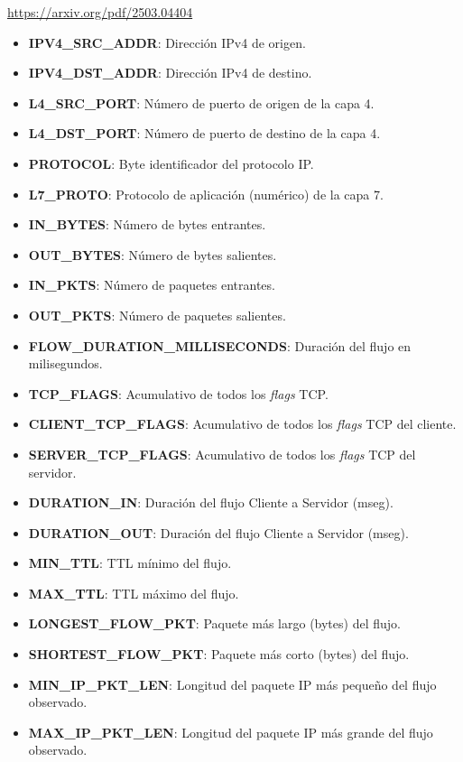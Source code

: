 \url{https://arxiv.org/pdf/2503.04404}

\begin{itemize}
    \item \textbf{IPV4\_SRC\_ADDR}: Dirección IPv4 de origen.
    \item \textbf{IPV4\_DST\_ADDR}: Dirección IPv4 de destino.
    \item \textbf{L4\_SRC\_PORT}: Número de puerto de origen de la capa 4.
    \item \textbf{L4\_DST\_PORT}: Número de puerto de destino de la capa 4.
    \item \textbf{PROTOCOL}: Byte identificador del protocolo IP.
    \item \textbf{L7\_PROTO}: Protocolo de aplicación (numérico) de la capa 7.
    \item \textbf{IN\_BYTES}: Número de bytes entrantes.
    \item \textbf{OUT\_BYTES}: Número de bytes salientes.
    \item \textbf{IN\_PKTS}: Número de paquetes entrantes.
    \item \textbf{OUT\_PKTS}: Número de paquetes salientes.
    \item \textbf{FLOW\_DURATION\_MILLISECONDS}: Duración del flujo en milisegundos.
    \item \textbf{TCP\_FLAGS}: Acumulativo de todos los \textit{flags} TCP.
    \item \textbf{CLIENT\_TCP\_FLAGS}: Acumulativo de todos los \textit{flags} TCP del cliente.
    \item \textbf{SERVER\_TCP\_FLAGS}: Acumulativo de todos los \textit{flags} TCP del servidor.
    \item \textbf{DURATION\_IN}: Duración del flujo Cliente a Servidor (mseg).
    \item \textbf{DURATION\_OUT}: Duración del flujo Cliente a Servidor (mseg).
    \item \textbf{MIN\_TTL}: TTL mínimo del flujo.
    \item \textbf{MAX\_TTL}: TTL máximo del flujo.
    \item \textbf{LONGEST\_FLOW\_PKT}: Paquete más largo (bytes) del flujo.
    \item \textbf{SHORTEST\_FLOW\_PKT}: Paquete más corto (bytes) del flujo.
    \item \textbf{MIN\_IP\_PKT\_LEN}: Longitud del paquete IP más pequeño del flujo observado.
    \item \textbf{MAX\_IP\_PKT\_LEN}: Longitud del paquete IP más grande del flujo observado.

\end{itemize}
